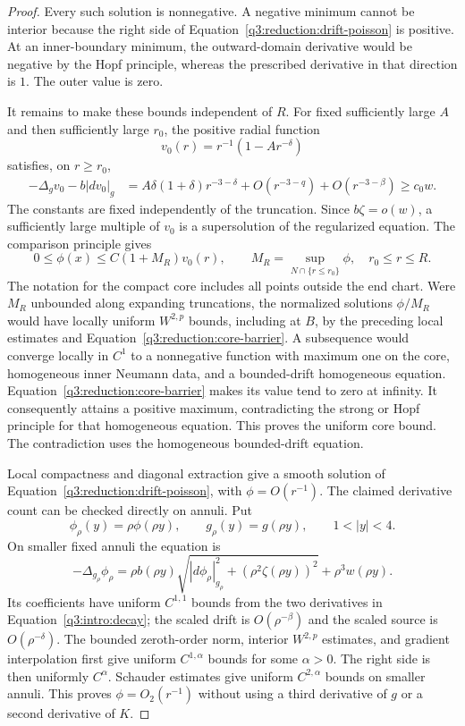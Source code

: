\begin{proof}
Every such solution is nonnegative.  A negative minimum cannot be
interior because the right side of
Equation~\eqref{q3:reduction:drift-poisson} is positive.  At an inner-boundary
minimum, the outward-domain derivative would be negative by the Hopf
principle, whereas the prescribed derivative in that direction is $1$.
The outer value is zero.

It remains to make these bounds independent of $R$.  For fixed sufficiently large
$A$ and then sufficiently large $r_0$, the positive radial function
\[
 v_0(r)=r^{-1}(1-Ar^{-\delta})
\]
satisfies, on $r\ge r_0$,
\begin{align*}
 -\Delta_gv_0-b|dv_0|_g
 &=A\delta(1+\delta)r^{-3-\delta}
       +O(r^{-3-q})+O(r^{-3-\beta})\ge c_0w.
\end{align*}
The constants are fixed independently of the truncation.  Since
$b\zeta=o(w)$, a sufficiently large multiple of $v_0$ is a supersolution
of the regularized equation.  The comparison principle gives
\begin{equation}
 \label{q3:reduction:core-barrier}
 0\le\phi(x)\le C(1+M_R)v_0(r),\qquad
 M_R=\sup_{N\cap\{r\le r_0\}}\phi,
 \quad r_0\le r\le R.
\end{equation}
The notation for the compact core includes all points outside the end
chart.  Were $M_R$ unbounded along expanding truncations, the normalized
solutions $\phi/M_R$ would have locally uniform $W^{2,p}$ bounds, including
at $B$, by the preceding local estimates and
Equation~\eqref{q3:reduction:core-barrier}.  A subsequence would converge
locally in $C^1$ to a nonnegative function with maximum one on the core,
homogeneous inner Neumann data, and a bounded-drift homogeneous equation.
Equation~\eqref{q3:reduction:core-barrier} makes its value tend to zero at
infinity.  It consequently attains a positive maximum, contradicting the
strong or Hopf principle for that homogeneous equation.  This proves the
uniform core bound.  The contradiction uses the homogeneous bounded-drift
equation.

Local compactness and diagonal extraction give a smooth solution of
Equation~\eqref{q3:reduction:drift-poisson}, with $\phi=O(r^{-1})$.
The claimed derivative count can be checked directly on annuli.  Put
\[
 \phi_{\rho}(y)=\rho\phi(\rho y),\qquad
 g_{\rho}(y)=g(\rho y),\qquad 1<|y|<4.
\]
On smaller fixed annuli the equation is
\[
 -\Delta_{g_{\rho}}\phi_{\rho}
 =\rho b(\rho y)
       \sqrt{|d\phi_{\rho}|_{g_{\rho}}^2+
                     (\rho^2\zeta(\rho y))^2}
       +\rho^3w(\rho y).
\]
Its coefficients have uniform $C^{1,1}$ bounds from the two derivatives
in Equation~\eqref{q3:intro:decay}; the scaled drift is
$O(\rho^{-\beta})$ and the scaled source is $O(\rho^{-\delta})$.
The bounded zeroth-order norm, interior $W^{2,p}$ estimates, and gradient
interpolation first give uniform $C^{1,\alpha}$ bounds for some
$\alpha>0$.  The right side is then uniformly $C^\alpha$.  Schauder
estimates give uniform $C^{2,\alpha}$ bounds on smaller annuli.  This
proves $\phi=O_2(r^{-1})$ without using a third derivative of $g$ or a
second derivative of $K$.


\end{proof}
